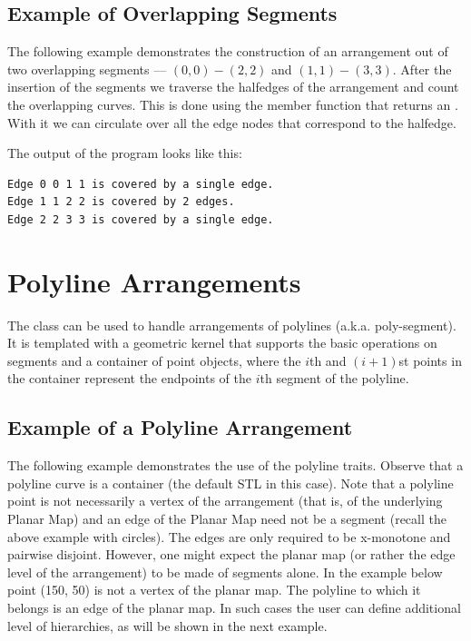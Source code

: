 \subsection{Example of Overlapping Segments}
\label{ssec:example2}
The following example demonstrates the construction of an
arrangement out of two overlapping segments --- $(0,0)-(2,2)$
and $(1,1)-(3,3)$.
After the insertion of the segments we
traverse the halfedges
of the arrangement and count the overlapping curves.
This is done using the  member function that returns an
. With it we can circulate
over all the edge nodes that correspond to the halfedge.


The output of the program looks like this:
\begin{verbatim}
Edge 0 0 1 1 is covered by a single edge.
Edge 1 1 2 2 is covered by 2 edges.
Edge 2 2 3 3 is covered by a single edge.
\end{verbatim}

\section{Polyline Arrangements}

The  class can be used to 
handle arrangements of polylines (a.k.a. poly-segment). It is templated with
a geometric kernel that supports the basic operations on segments and a 
container of point objects, where the $i$th and $(i+1)$st points in the 
container represent the endpoints of the $i$th segment of the polyline.

\subsection{Example of a Polyline Arrangement}
\label{ssec:example10}
The following example demonstrates the use of the polyline traits.
Observe that a polyline curve is a container (the default STL in this case).
Note that a polyline point is not necessarily a vertex of the arrangement 
(that is, of the underlying Planar Map) and an edge of the Planar Map need 
not be a segment (recall the above example with circles). The edges are only 
required to be x-monotone and pairwise disjoint. However, one might expect 
the planar map (or rather the edge level of the arrangement) to be made of 
segments alone.  In the example below point (150, 50) is not a vertex of 
the planar map.  The polyline to which it belongs is an edge of the planar 
map. In such cases the user can define additional level of hierarchies, 
as will be shown in the next example.

